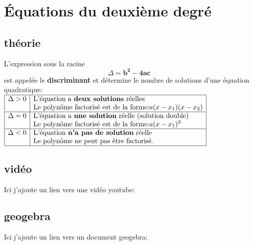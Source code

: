 \documentclass[a4paper,11pt]{article}
\begin{document}
\section{Équations du deuxième degré}
\subsection{théorie}
L'expression sous la racine $$\Delta= \mathbf{b^2-4ac}$$ est appelée le \textbf{discriminant} et détermine le nombre de solutions d'une équation quadratique:\\
$\begin{array}{|l | l |}
\hline
\Delta>0 & \text{L'équation a \textbf{deux solutions} réelles} \\
& \text{Le polynôme factorisé est de la forme:}  a(x - x_{1})(x - x_{2}) \\
\hline
\Delta=0 & \text{L'équation a \textbf{une solution} réelle (solution double)}\\
& \text{Le polynôme factorisé est de la forme:}  a(x - x_{1})^2\\
\hline
\Delta<0 & \text{L'équation \textbf{n'a pas de solution} réelle}\\
& \text{Le polynôme ne peut pas être factorisé.}\\
\hline
\end{array}$\par

\subsection{vidéo}
Ici j'ajoute un lien vers une vidéo youtube:\par
{}

\subsection{geogebra}
Ici j'ajoute un lien vers un document geogebra:\par
{}
\end{document}

